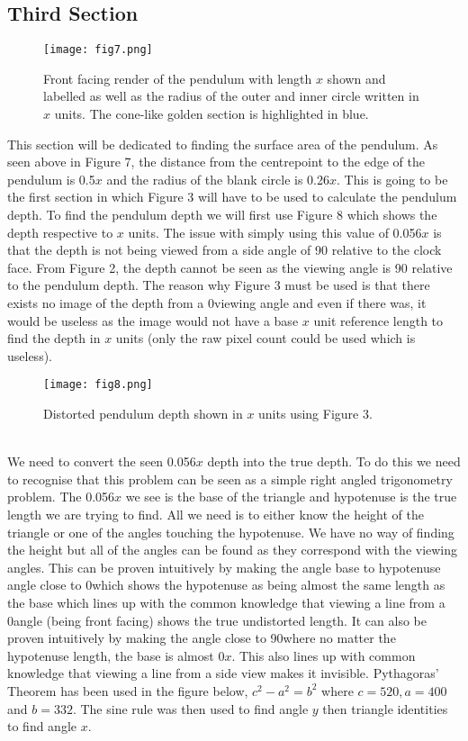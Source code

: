 \documentclass[a4paper,12pt]{article}
\begin{document}
\subsection{Third Section}
\begin{figure}
\centering
\texttt{[image: fig7.png]}
\caption{Front facing render of the pendulum with length $x$ shown and labelled as well as the radius of the outer and inner circle written in $x$ units. The cone-like golden section is highlighted in blue.}
\label{fig:clock7}
\end{figure}
This section will be dedicated to finding the surface area of the pendulum. As seen above in Figure 7, the distance from the centrepoint to the edge of the pendulum is 0.5$x$ and the radius of the blank circle is 0.26$x$. 
This is going to be the first section in which Figure 3 will have to be used to calculate the pendulum depth. To find the pendulum depth we will first use Figure 8 which shows the depth respective to $x$ units. The issue with simply using this value of 0.056$x$ is that the depth is not being viewed from a side angle of 90\degree \: relative to the clock face. From Figure 2, the depth cannot be seen as the viewing angle is 90\degree \: relative to the pendulum depth. The reason why Figure 3 must be used is that there exists no image of the depth from a 0\degree \:viewing angle and even if there was, it would be useless as the image would not have a base $x$ unit reference length to find the depth in $x$ units (only the raw pixel count could be used which is useless). 
\begin{figure}[h!]
\centering
\texttt{[image: fig8.png]}
\caption{Distorted pendulum depth shown in $x$ units using Figure 3.}
\label{fig:clock8}
\end{figure}
\\We need to convert the seen 0.056$x$ depth into the true depth. To do this we need to recognise that this problem can be seen as a simple right angled trigonometry problem. The 0.056$x$ we see is the base of the triangle and hypotenuse is the true length we are trying to find. All we need is to either know the height of the triangle or one of the angles touching the hypotenuse. We have no way of finding the height but all of the angles can be found as they correspond with the viewing angles. This can be proven intuitively by making the angle base to hypotenuse angle close to 0\degree \:which shows the hypotenuse as being almost the same length as the base which lines up with the common knowledge that viewing a line from a 0\degree \:angle (being front facing) shows the true undistorted length. It can also be proven intuitively by making the angle close to 90\degree \:where no matter the hypotenuse length, the base is almost 0$x$. This also lines up with common knowledge that viewing a line from a side view makes it invisible. Pythagoras' Theorem has been used in the figure below, $c^2-a^2=b^2$ where $c=520, a=400$ and $b=332$. The sine rule was then used to find angle $y$ then triangle identities to find angle $x$.
\end{document}
